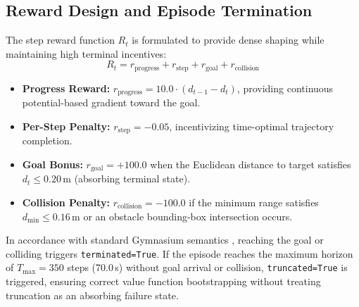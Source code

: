\documentclass[conference]{IEEEtran}
\begin{document}
\subsection{Reward Design and Episode Termination}
The step reward function $R_t$ is formulated to provide dense shaping while maintaining high terminal incentives:
\begin{equation}
R_t = r_{\text{progress}} + r_{\text{step}} + r_{\text{goal}} + r_{\text{collision}}
\end{equation}
\begin{itemize}
    \item \textbf{Progress Reward:} $r_{\text{progress}} = 10.0 \cdot (d_{t-1} - d_t)$, providing continuous potential-based gradient toward the goal.
    \item \textbf{Per-Step Penalty:} $r_{\text{step}} = -0.05$, incentivizing time-optimal trajectory completion.
    \item \textbf{Goal Bonus:} $r_{\text{goal}} = +100.0$ when the Euclidean distance to target satisfies $d_t \le 0.20\,\text{m}$ (absorbing terminal state).
    \item \textbf{Collision Penalty:} $r_{\text{collision}} = -100.0$ if the minimum range satisfies $d_{\min} \le 0.16\,\text{m}$ or an obstacle bounding-box intersection occurs.
\end{itemize}
In accordance with standard Gymnasium semantics \cite{towers2023gymnasium}, reaching the goal or colliding triggers \texttt{terminated=True}. If the episode reaches the maximum horizon of $T_{\max} = 350$ steps (70.0\,s) without goal arrival or collision, \texttt{truncated=True} is triggered, ensuring correct value function bootstrapping without treating truncation as an absorbing failure state.
\end{document}

